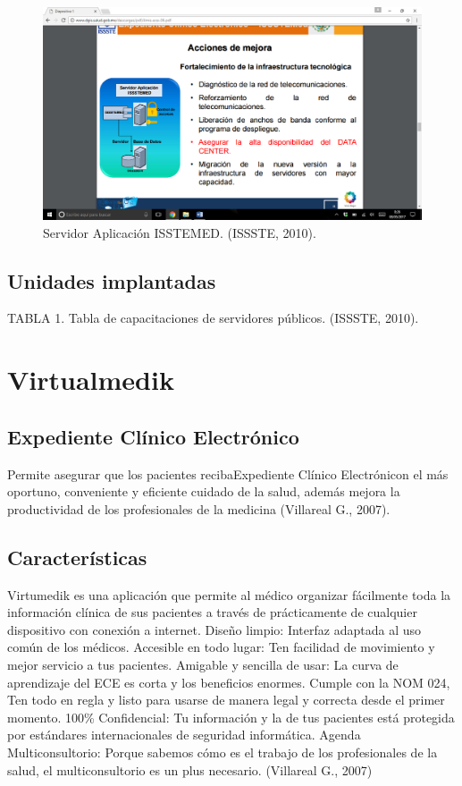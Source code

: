\begin{figure}[h]
  \centering
  \label{figura1}
  \includegraphics[scale=.35]{lib/assets/1}
  \caption{Servidor Aplicación ISSTEMED. (ISSSTE, 2010).}
\end{figure}


 \subsection{Unidades implantadas}

TABLA 1. Tabla de capacitaciones de servidores públicos. (ISSSTE, 2010).



\section{Virtualmedik}

\subsection{Expediente Clínico Electrónico}
Permite asegurar que los pacientes recibaExpediente Clínico Electrónicon el más oportuno, conveniente y eficiente cuidado de la salud, además mejora la productividad de los profesionales de la medicina (Villareal G., 2007).

\subsection{Características}
Virtumedik es una aplicación que permite al médico organizar fácilmente toda la información clínica de sus pacientes a través de prácticamente de cualquier dispositivo con conexión a internet.
Diseño limpio: Interfaz adaptada al uso común de los médicos.
Accesible en todo lugar: Ten facilidad de movimiento y mejor servicio a tus pacientes.
Amigable y sencilla de usar: La curva de aprendizaje del ECE es corta y los beneficios enormes.
Cumple con la NOM 024, Ten todo en regla y listo para usarse de manera legal y correcta desde el primer momento.
100\% Confidencial: Tu información y la de tus pacientes está protegida por estándares internacionales de seguridad informática.
Agenda Multiconsultorio: Porque sabemos cómo es el trabajo de los profesionales de la salud, el multiconsultorio es un plus necesario. (Villareal G., 2007)

